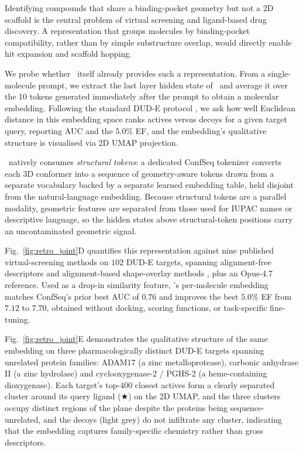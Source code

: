 Identifying compounds that share a binding-pocket geometry but not a 2D scaffold is the central problem of virtual screening and ligand-based drug discovery. A representation that groups molecules by binding-pocket compatibility, rather than by simple substructure overlap, would directly enable hit expansion and scaffold hopping.

We probe whether \projName~itself already provides such a representation. From a single-molecule prompt, we extract the last layer hidden state of \projName~and average it over the 10 tokens generated immediately after the prompt to obtain a molecular embedding. Following the standard DUD-E protocol \citep{mysinger2012directory}, we ask how well Euclidean distance in this embedding space ranks actives versus decoys for a given target query, reporting AUC and the $5.0\%$ EF, and the embedding's qualitative structure is visualised via 2D UMAP projection.


\projName~natively consumes \emph{structural tokens}: a dedicated ConfSeq \citep{xiong2025bridging} tokenizer converts each 3D conformer into a sequence of geometry-aware tokens drawn from a separate vocabulary backed by a separate learned embedding table, held disjoint from the natural-language embedding. Because structural tokens are a parallel modality, geometric features are separated from those used for IUPAC names or descriptive language, so the hidden states above structural-token positions carry an uncontaminated geometric signal.

Fig.~\ref{fig:retro_joint}D quantifies this representation against nine published virtual-screening methods on $102$ DUD-E targets, spanning alignment-free descriptors and alignment-based shape-overlay methods \citep{hemmer1999deriving,devinyak20143d,klein2004topological,axen2017simple,xiong2025bridging,vainio2009shaep,sastry2011rapid,liu2011shafts,hu2018ls}, plus an Opus-4.7~\citep{opus47} reference. Used as a drop-in similarity feature, \projName's per-molecule embedding matches ConfSeq's prior best AUC of $0.76$ and improves the best $5.0\%$ EF from $7.12$ to $7.70$, obtained without docking, scoring functions, or task-specific fine-tuning.

Fig.~\ref{fig:retro_joint}E demonstrates the qualitative structure of the same embedding on three pharmacologically distinct DUD-E targets spanning unrelated protein families: ADAM17 (a zinc metalloprotease), carbonic anhydrase II (a zinc hydrolase) and cyclooxygenase-2 / PGHS-2 (a heme-containing dioxygenase). Each target's top-$400$ closest actives form a clearly separated cluster around its query ligand ($\bigstar$) on the 2D UMAP, and the three clusters occupy distinct regions of the plane despite the proteins being sequence-unrelated, and the decoys (light grey) do not infiltrate any cluster, indicating that the embedding captures family-specific chemistry rather than gross descriptors.

